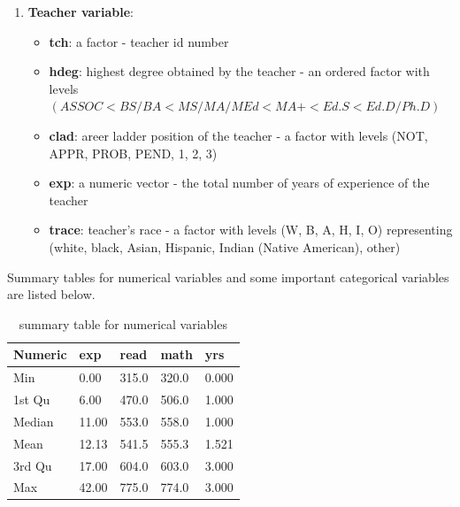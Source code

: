 \documentclass{article}
\begin{document}
\begin{enumerate}[1]
    \item \textbf{Teacher variable}:
        \begin{itemize}
            \item \textbf{tch}: a factor - teacher id number
            \item \textbf{hdeg}: highest degree obtained by the teacher - an ordered factor with levels $(ASSOC < BS/BA < MS/MA/MEd 
            < MA+ < Ed.S < Ed.D/Ph.D)$
            \item \textbf{clad}: areer ladder position of the teacher - a factor with levels (NOT, APPR, PROB, PEND, 1, 2, 3)
            \item \textbf{exp}: a numeric vector - the total number of years of experience of the teacher 
            \item \textbf{trace}: teacher’s race - a factor with levels (W, B, A, H, I, O) representing (white, black, Asian, 
            Hispanic, Indian (Native American), other)
        \end{itemize}

\end{enumerate}

Summary tables for numerical variables and some important categorical variables are listed below.

\begin{table}[h]
    \centering
    \caption{summary table for numerical variables}
    \label{table:numerical variables}
    \begin{tabular}{|l|l|l|l|l|}
    \hline
    Numeric & exp   & read  & math  & yrs   \\ \hline
    Min     & 0.00  & 315.0 & 320.0 & 0.000 \\ \hline
    1st Qu  & 6.00  & 470.0 & 506.0 & 1.000 \\ \hline
    Median  & 11.00 & 553.0 & 558.0 & 1.000 \\ \hline
    Mean    & 12.13 & 541.5 & 555.3 & 1.521 \\ \hline
    3rd Qu  & 17.00 & 604.0 & 603.0 & 3.000 \\ \hline
    Max     & 42.00 & 775.0 & 774.0 & 3.000 \\ \hline
    \end{tabular}
\end{table}
\end{document}
